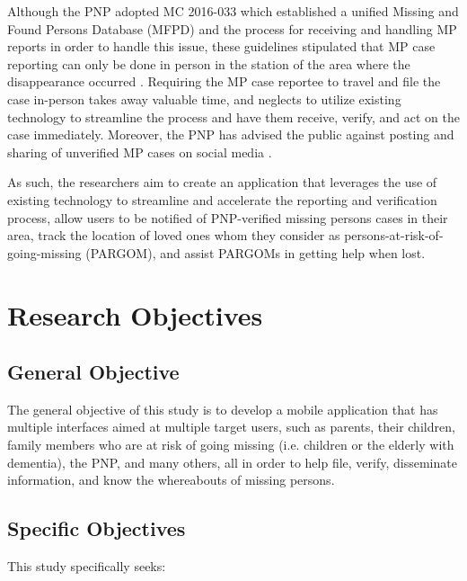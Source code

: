 Although the PNP adopted MC 2016-033 which established a unified Missing and Found Persons Database (MFPD) and the process for receiving and handling MP reports in order to handle this issue, these guidelines stipulated that MP case reporting can only be done in person in the station of the area where the disappearance occurred \cite{NationalPoliceCommission}. Requiring the MP case reportee to travel and file the case in-person takes away valuable time, and neglects to utilize existing technology to streamline the process and have them receive, verify, and act on the case immediately. Moreover, the PNP has advised the public against posting and sharing of unverified MP cases on social media \cite{madarang_2022}.

As such, the researchers aim to create an application that leverages the use of existing technology to streamline and accelerate the reporting and verification process, allow users to be notified of PNP-verified missing persons cases in their area, track the location of loved ones whom they consider as persons-at-risk-of-going-missing (PARGOM), and assist PARGOMs in getting help when lost.



\section{Research Objectives}
\label{sec:researchobjectives}

\subsection{General Objective}
\label{sec:generalobjective}

The general objective of this study is to develop a mobile application that has multiple interfaces aimed at multiple target users, such as parents, their children, family members who are at risk of going missing (i.e. children or the elderly with dementia), the PNP, and many others, all in order to help file, verify, disseminate information, and know the whereabouts of missing persons.

\subsection{Specific Objectives}
\label{sec:specificobjectives}

This study specifically seeks:

